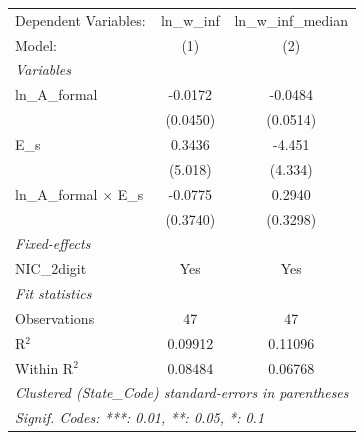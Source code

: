 
\begingroup
\centering
\begin{tabular}{lcc}
   \tabularnewline \midrule \midrule
   Dependent Variables:            & ln\_w\_inf   & ln\_w\_inf\_median\\     
   Model:                          & (1)          & (2)\\  
   \midrule
   \emph{Variables}\\
   ln\_A\_formal                   & -0.0172      & -0.0484\\   
                                   & (0.0450)     & (0.0514)\\   
   E\_s                            & 0.3436       & -4.451\\   
                                   & (5.018)      & (4.334)\\   
   ln\_A\_formal $\times$ E\_s     & -0.0775      & 0.2940\\   
                                   & (0.3740)     & (0.3298)\\   
   \midrule
   \emph{Fixed-effects}\\
   NIC\_2digit                     & Yes          & Yes\\  
   \midrule
   \emph{Fit statistics}\\
   Observations                    & 47           & 47\\  
   R$^2$                           & 0.09912      & 0.11096\\  
   Within R$^2$                    & 0.08484      & 0.06768\\  
   \midrule \midrule
   \multicolumn{3}{l}{\emph{Clustered (State\_Code) standard-errors in parentheses}}\\
   \multicolumn{3}{l}{\emph{Signif. Codes: ***: 0.01, **: 0.05, *: 0.1}}\\
\end{tabular}
\par\endgroup


